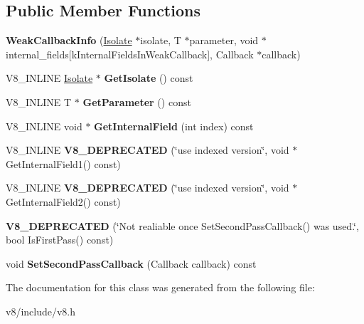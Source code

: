 \subsection*{Public Member Functions}
\begin{DoxyCompactItemize}
\item 
{\bfseries Weak\+Callback\+Info} (\hyperlink{classv8_1_1Isolate}{Isolate} $\ast$isolate, T $\ast$parameter, void $\ast$internal\+\_\+fields\mbox{[}k\+Internal\+Fields\+In\+Weak\+Callback\mbox{]}, Callback $\ast$callback)\hypertarget{classv8_1_1WeakCallbackInfo_a0863d1a5dba908ef4ac42298be4ee402}{}\label{classv8_1_1WeakCallbackInfo_a0863d1a5dba908ef4ac42298be4ee402}

\item 
V8\+\_\+\+I\+N\+L\+I\+NE \hyperlink{classv8_1_1Isolate}{Isolate} $\ast$ {\bfseries Get\+Isolate} () const \hypertarget{classv8_1_1WeakCallbackInfo_a5f0fe68cc18853467d3713b1ec48da9a}{}\label{classv8_1_1WeakCallbackInfo_a5f0fe68cc18853467d3713b1ec48da9a}

\item 
V8\+\_\+\+I\+N\+L\+I\+NE T $\ast$ {\bfseries Get\+Parameter} () const \hypertarget{classv8_1_1WeakCallbackInfo_a515eb1547d96a9813e447e8acfb46a1a}{}\label{classv8_1_1WeakCallbackInfo_a515eb1547d96a9813e447e8acfb46a1a}

\item 
V8\+\_\+\+I\+N\+L\+I\+NE void $\ast$ {\bfseries Get\+Internal\+Field} (int index) const \hypertarget{classv8_1_1WeakCallbackInfo_ac14e2ded95ad11763a5fdf601e69e004}{}\label{classv8_1_1WeakCallbackInfo_ac14e2ded95ad11763a5fdf601e69e004}

\item 
V8\+\_\+\+I\+N\+L\+I\+NE {\bfseries V8\+\_\+\+D\+E\+P\+R\+E\+C\+A\+T\+ED} (\char`\"{}use indexed version\char`\"{}, void $\ast$Get\+Internal\+Field1() const)\hypertarget{classv8_1_1WeakCallbackInfo_a3e5c3c00672dc02931fea46129432e80}{}\label{classv8_1_1WeakCallbackInfo_a3e5c3c00672dc02931fea46129432e80}

\item 
V8\+\_\+\+I\+N\+L\+I\+NE {\bfseries V8\+\_\+\+D\+E\+P\+R\+E\+C\+A\+T\+ED} (\char`\"{}use indexed version\char`\"{}, void $\ast$Get\+Internal\+Field2() const)\hypertarget{classv8_1_1WeakCallbackInfo_a8eec746a3a9435af3ef0555c454f780b}{}\label{classv8_1_1WeakCallbackInfo_a8eec746a3a9435af3ef0555c454f780b}

\item 
{\bfseries V8\+\_\+\+D\+E\+P\+R\+E\+C\+A\+T\+ED} (\char`\"{}Not realiable once Set\+Second\+Pass\+Callback() was used.\char`\"{}, bool Is\+First\+Pass() const)\hypertarget{classv8_1_1WeakCallbackInfo_a619bad43989c80ac8cbba4ecfa37d8d9}{}\label{classv8_1_1WeakCallbackInfo_a619bad43989c80ac8cbba4ecfa37d8d9}

\item 
void {\bfseries Set\+Second\+Pass\+Callback} (Callback callback) const \hypertarget{classv8_1_1WeakCallbackInfo_a17590c561d242f1250b4cd4020eb8cd7}{}\label{classv8_1_1WeakCallbackInfo_a17590c561d242f1250b4cd4020eb8cd7}

\end{DoxyCompactItemize}


The documentation for this class was generated from the following file\+:\begin{DoxyCompactItemize}
\item 
v8/include/v8.\+h\end{DoxyCompactItemize}
